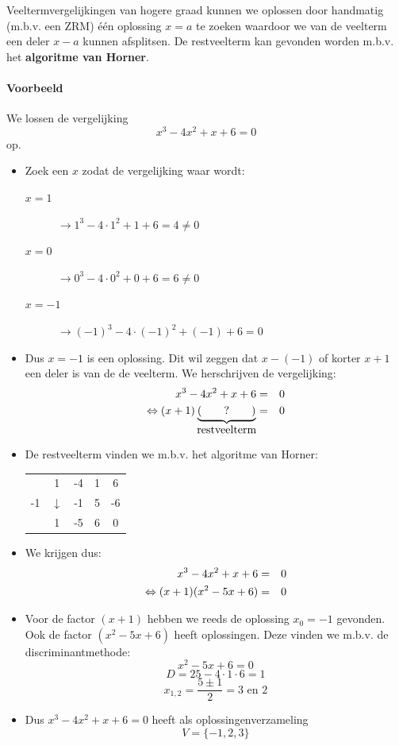 \documentclass[12pt,twoside,a4paper]{article}
\begin{document}
Veeltermvergelijkingen van hogere graad kunnen we oplossen door handmatig (m.b.v. een ZRM) één oplossing $x=a$ te zoeken waardoor we van de veelterm een deler $x-a$ kunnen afsplitsen. De restveelterm kan gevonden worden m.b.v. het {\bf algoritme van Horner}.

\paragraph{Voorbeeld}

We lossen de vergelijking $$x^3-4x^2+x+6=0$$ op.

\begin{itemize}
\item Zoek een $x$ zodat de vergelijking waar wordt:
  \begin{description}
  \item[$x=1$] $\rightarrow 1^3-4\cdot 1^2+1+6 = 4 \neq 0$
  \item[$x=0$] $\rightarrow 0^3-4\cdot 0^2+0+6 = 6 \neq 0$
  \item[$x=-1$] $\rightarrow (-1)^3-4\cdot (-1)^2+(-1)+6 = 0$
  \end{description}
\item Dus $x=-1$ is een oplossing. Dit wil zeggen dat $x-(-1)$ of korter $x+1$ een deler is van de de veelterm. We herschrijven de vergelijking:
  \begin{eqnarray*}
    x^3-4x^2+x+6&=&0\\
    \Leftrightarrow (x+1)\underbrace{(\qquad ? \qquad)}_{\mbox{restveelterm}}&=&0\\
  \end{eqnarray*}
\item De restveelterm vinden we m.b.v. het algoritme van Horner:
  \begin{center}
    \begin{tabular}{c|cccc}
      & 1 & -4 & 1 & 6\\
      -1 & $\downarrow$ & -1 & 5 & -6\\
      \hline
      & 1 & -5 & 6 & 0
    \end{tabular}
  \end{center}
\item We krijgen dus:
  \begin{eqnarray*}
    x^3-4x^2+x+6&=&0\\
    \Leftrightarrow (x+1)(x^2-5x+6)&=&0\\
  \end{eqnarray*}
\item Voor de factor $(x+1)$ hebben we reeds de oplossing $x_0=-1$ gevonden. Ook de factor $(x^2-5x+6)$ heeft oplossingen. Deze vinden we m.b.v. de discriminantmethode:
  $$x^2-5x+6=0$$
  $$D=25-4\cdot 1\cdot 6=1$$
  $$x_{1,2}=\dfrac{5\pm 1}{2}=3\mbox{ en }2$$
\item Dus $x^3-4x^2+x+6=0$ heeft als oplossingenverzameling
  $$V=\{-1, 2, 3\}$$
\end{itemize}
\end{document}
